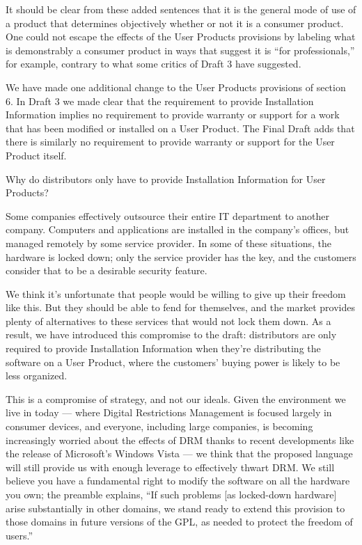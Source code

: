It should be clear from these added sentences that it is the general
mode of use of a product that determines objectively whether or not it
is a consumer product.  One could not escape the effects of the User
Products provisions by labeling what is demonstrably a consumer product
in ways that suggest it is ``for professionals,'' for example, contrary
to what some critics of Draft 3 have suggested.

We have made one additional change to the User Products provisions of
section 6.  In Draft 3 we made clear that the requirement to provide
Installation Information implies no requirement to provide warranty or
support for a work that has been modified or installed on a User
Product.  The Final Draft adds that there is similarly no requirement to
provide warranty or support for the User Product itself.


Why do distributors only have to provide Installation Information for User
Products?

Some companies effectively outsource their entire IT department to another
company. Computers and applications are installed in the company's offices,
but managed remotely by some service provider. In some of these situations,
the hardware is locked down; only the service provider has the key, and the
customers consider that to be a desirable security feature.

We think it's unfortunate that people would be willing to give up their
freedom like this.  But they should be able to fend for themselves, and the
market provides plenty of alternatives to these services that would not lock
them down. As a result, we have introduced this compromise to the draft:
distributors are only required to provide Installation Information when
they're distributing the software on a User Product, where the customers'
buying power is likely to be less organized.

This is a compromise of strategy, and not our ideals. Given the environment
we live in today --- where Digital Restrictions Management is focused largely
in consumer devices, and everyone, including large companies, is becoming
increasingly worried about the effects of DRM thanks to recent developments
like the release of Microsoft's Windows Vista --- we think that the proposed
language will still provide us with enough leverage to effectively thwart
DRM. We still believe you have a fundamental right to modify the software on
all the hardware you own; the preamble explains, ``If such problems [as
  locked-down hardware] arise substantially in other domains, we stand ready
to extend this provision to those domains in future versions of the GPL, as
needed to protect the freedom of users.''


